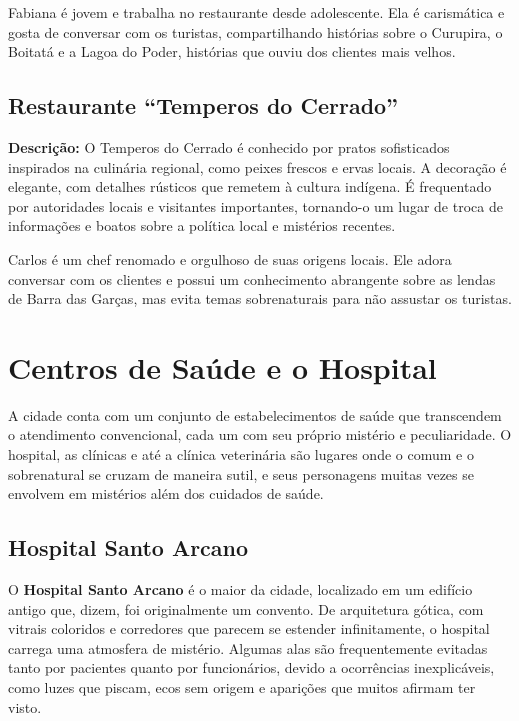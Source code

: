 {Fabiana é jovem e trabalha no restaurante desde adolescente. Ela é carismática e gosta de conversar com os turistas, compartilhando histórias sobre o Curupira, o Boitatá e a Lagoa do Poder, histórias que ouviu dos clientes mais velhos.}
{}




\subsection{Restaurante ``Temperos do Cerrado''}
\textbf{Descrição:}  
O Temperos do Cerrado é conhecido por pratos sofisticados inspirados na culinária regional, como peixes frescos e ervas locais. A decoração é elegante, com detalhes rústicos que remetem à cultura indígena. É frequentado por autoridades locais e visitantes importantes, tornando-o um lugar de troca de informações e boatos sobre a política local e mistérios recentes.

{Carlos é um chef renomado e orgulhoso de suas origens locais. Ele adora conversar com os clientes e possui um conhecimento abrangente sobre as lendas de Barra das Garças, mas evita temas sobrenaturais para não assustar os turistas.}{}






\section{Centros de Saúde e o Hospital}

A cidade conta com um conjunto de estabelecimentos de saúde que transcendem o atendimento convencional, cada um com seu próprio mistério e peculiaridade. O hospital, as clínicas e até a clínica veterinária são lugares onde o comum e o sobrenatural se cruzam de maneira sutil, e seus personagens muitas vezes se envolvem em mistérios além dos cuidados de saúde.

\subsection{Hospital Santo Arcano}

O \textbf{Hospital Santo Arcano} é o maior da cidade, localizado em um edifício antigo que, dizem, foi originalmente um convento. De arquitetura gótica, com vitrais coloridos e corredores que parecem se estender infinitamente, o hospital carrega uma atmosfera de mistério. Algumas alas são frequentemente evitadas tanto por pacientes quanto por funcionários, devido a ocorrências inexplicáveis, como luzes que piscam, ecos sem origem e aparições que muitos afirmam ter visto. 

